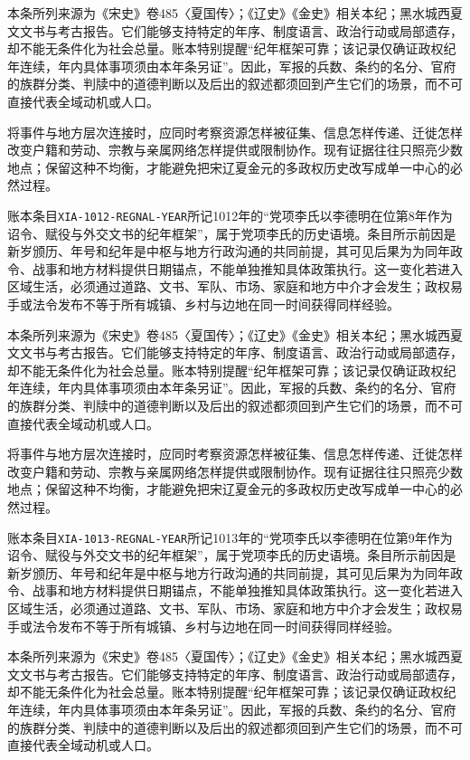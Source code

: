 本条所列来源为《宋史》卷485〈夏国传〉；《辽史》《金史》相关本纪；黑水城西夏文文书与考古报告。它们能够支持特定的年序、制度语言、政治行动或局部遗存，却不能无条件化为社会总量。账本特别提醒“纪年框架可靠；该记录仅确证政权纪年连续，年内具体事项须由本年条另证”。因此，军报的兵数、条约的名分、官府的族群分类、判牍中的道德判断以及后出的叙述都须回到产生它们的场景，而不可直接代表全域动机或人口。

将事件与地方层次连接时，应同时考察资源怎样被征集、信息怎样传递、迁徙怎样改变户籍和劳动、宗教与亲属网络怎样提供或限制协作。现有证据往往只照亮少数地点；保留这种不均衡，才能避免把宋辽夏金元的多政权历史改写成单一中心的必然过程。

账本条目\texttt{XIA-1012-REGNAL-YEAR}所记1012年的“党项李氏以李德明在位第8年作为诏令、赋役与外交文书的纪年框架”，属于党项李氏的历史语境。条目所示前因是新岁颁历、年号和纪年是中枢与地方行政沟通的共同前提，其可见后果为为同年政令、战事和地方材料提供日期锚点，不能单独推知具体政策执行。这一变化若进入区域生活，必须通过道路、文书、军队、市场、家庭和地方中介才会发生；政权易手或法令发布不等于所有城镇、乡村与边地在同一时间获得同样经验。

本条所列来源为《宋史》卷485〈夏国传〉；《辽史》《金史》相关本纪；黑水城西夏文文书与考古报告。它们能够支持特定的年序、制度语言、政治行动或局部遗存，却不能无条件化为社会总量。账本特别提醒“纪年框架可靠；该记录仅确证政权纪年连续，年内具体事项须由本年条另证”。因此，军报的兵数、条约的名分、官府的族群分类、判牍中的道德判断以及后出的叙述都须回到产生它们的场景，而不可直接代表全域动机或人口。

将事件与地方层次连接时，应同时考察资源怎样被征集、信息怎样传递、迁徙怎样改变户籍和劳动、宗教与亲属网络怎样提供或限制协作。现有证据往往只照亮少数地点；保留这种不均衡，才能避免把宋辽夏金元的多政权历史改写成单一中心的必然过程。

账本条目\texttt{XIA-1013-REGNAL-YEAR}所记1013年的“党项李氏以李德明在位第9年作为诏令、赋役与外交文书的纪年框架”，属于党项李氏的历史语境。条目所示前因是新岁颁历、年号和纪年是中枢与地方行政沟通的共同前提，其可见后果为为同年政令、战事和地方材料提供日期锚点，不能单独推知具体政策执行。这一变化若进入区域生活，必须通过道路、文书、军队、市场、家庭和地方中介才会发生；政权易手或法令发布不等于所有城镇、乡村与边地在同一时间获得同样经验。

本条所列来源为《宋史》卷485〈夏国传〉；《辽史》《金史》相关本纪；黑水城西夏文文书与考古报告。它们能够支持特定的年序、制度语言、政治行动或局部遗存，却不能无条件化为社会总量。账本特别提醒“纪年框架可靠；该记录仅确证政权纪年连续，年内具体事项须由本年条另证”。因此，军报的兵数、条约的名分、官府的族群分类、判牍中的道德判断以及后出的叙述都须回到产生它们的场景，而不可直接代表全域动机或人口。

